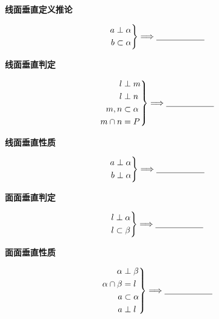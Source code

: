 \documentclass{exam-zh}
\begin{document}
\begin{question}[points=5]
  \textbf{线面垂直定义推论}\par
\[
\left.
\begin{aligned}
a&\perp\alpha\\
b&\subset\alpha
\end{aligned}
\right\}
\Longrightarrow
\underline{\hspace{20mm}}
\]


\end{question}



\begin{question}[points=5]
  \textbf{线面垂直判定}\par
\[
\left.
\begin{aligned}
l&\perp m\\
l&\perp n\\
m,n&\subset\alpha\\
m\cap n&=P
\end{aligned}
\right\}
\Longrightarrow
\underline{\hspace{20mm}}
\]


\end{question}



\begin{question}[points=5]
  \textbf{线面垂直性质}\par
\[
\left.
\begin{aligned}
a&\perp\alpha\\
b&\perp\alpha
\end{aligned}
\right\}
\Longrightarrow
\underline{\hspace{20mm}}
\]


\end{question}



\begin{question}[points=5]
  \textbf{面面垂直判定}\par
\[
\left.
\begin{aligned}
l&\perp\alpha\\
l&\subset\beta
\end{aligned}
\right\}
\Longrightarrow
\underline{\hspace{20mm}}
\]


\end{question}



\begin{question}[points=5]
  \textbf{面面垂直性质}\par
\[
\left.
\begin{aligned}
\alpha&\perp\beta\\
\alpha\cap\beta&=l\\
a&\subset\alpha\\
a&\perp l
\end{aligned}
\right\}
\Longrightarrow
\underline{\hspace{20mm}}
\]


\end{question}
\end{document}
